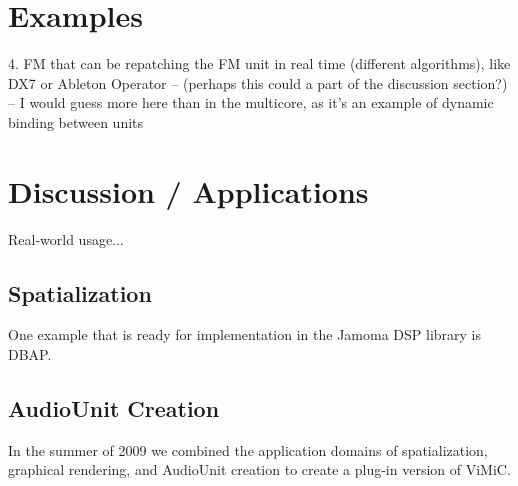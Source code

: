 \documentclass[twoside,10pt]{article}
\begin{document}
    
    





\section{Examples} %

4. FM that can be repatching the FM unit in real time (different algorithms), like DX7 or Ableton Operator  -- (perhaps this could a part of the discussion section?) -- I would guess more here than in the multicore, as it's an example of dynamic binding between units






\section{Discussion / Applications} %

Real-world usage...

\subsection{Spatialization}


One example that is ready for implementation in the Jamoma DSP library is DBAP\cite{Lossius:2009}.


\subsection{AudioUnit Creation}

In the summer of 2009 we combined the application domains of spatialization, graphical rendering, and AudioUnit creation to create a plug-in version of ViMiC\cite{Peters:2008b}.
\end{document}
